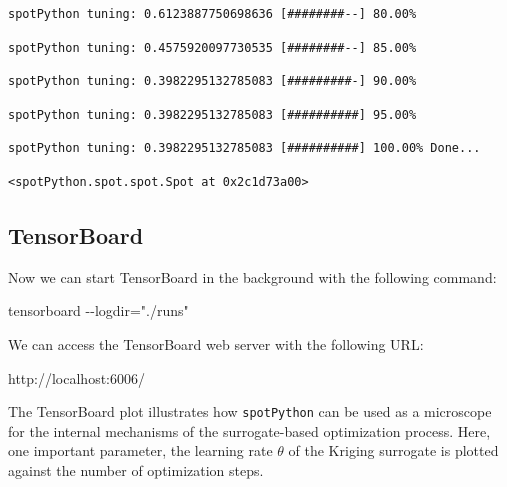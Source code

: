 \documentclass[
  letterpaper,
  DIV=11,
  numbers=noendperiod]{scrreprt}
\newenvironment{Shaded}{\begin{snugshade}}{\end{snugshade}}
\newcommand{\NormalTok}[1]{\textcolor[rgb]{0.00,0.23,0.31}{#1}}
\begin{document}
\begin{verbatim}
spotPython tuning: 0.6123887750698636 [########--] 80.00% 
\end{verbatim}

\begin{verbatim}
spotPython tuning: 0.4575920097730535 [########--] 85.00% 
\end{verbatim}

\begin{verbatim}
spotPython tuning: 0.3982295132785083 [#########-] 90.00% 
\end{verbatim}

\begin{verbatim}
spotPython tuning: 0.3982295132785083 [##########] 95.00% 
\end{verbatim}

\begin{verbatim}
spotPython tuning: 0.3982295132785083 [##########] 100.00% Done...
\end{verbatim}

\begin{verbatim}
<spotPython.spot.spot.Spot at 0x2c1d73a00>
\end{verbatim}

\hypertarget{tensorboard-5}{%
\subsection{TensorBoard}\label{tensorboard-5}}

Now we can start TensorBoard in the background with the following
command:

\begin{Shaded}
\begin{Highlighting}[]
\NormalTok{tensorboard {-}{-}logdir="./runs"}
\end{Highlighting}
\end{Shaded}

We can access the TensorBoard web server with the following URL:

\begin{Shaded}
\begin{Highlighting}[]
\NormalTok{http://localhost:6006/}
\end{Highlighting}
\end{Shaded}

The TensorBoard plot illustrates how \texttt{spotPython} can be used as
a microscope for the internal mechanisms of the surrogate-based
optimization process. Here, one important parameter, the learning rate
\(\theta\) of the Kriging surrogate is plotted against the number of
optimization steps.
\end{document}
